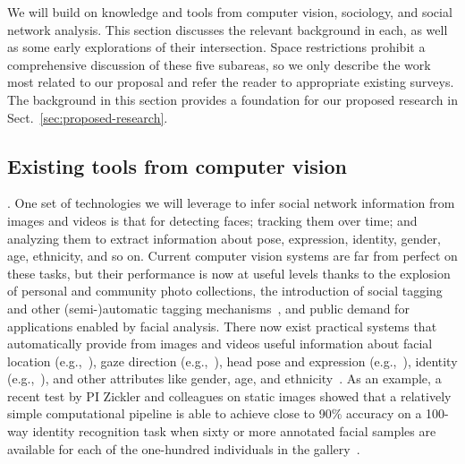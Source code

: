
We will build on knowledge and tools from computer vision, sociology, and social network analysis. This section discusses the relevant background in each, as well as some early explorations of their intersection. Space restrictions prohibit a comprehensive discussion of these five subareas, so we only describe the work most related to our proposal and refer the reader to appropriate existing surveys. The background in this section provides a foundation for our proposed research in Sect.~\ref{sec:proposed-research}.

\subsection{Existing tools from computer vision}

. One set of technologies we will leverage to infer social network information from images and videos is that for detecting faces; tracking them over time; and analyzing them to extract information about pose, expression, identity, gender, age, ethnicity, and so on.  Current computer vision systems are  far from perfect on these tasks, but their performance is now at useful levels thanks to the explosion of personal and community photo collections, the introduction of social tagging~\cite{Stone2008,Stone2010} and other (semi-)automatic tagging mechanisms~\cite{berg2004naf,berg2005sp,Everingham06a,huang:lfw}, and public demand for applications enabled by facial analysis. There now exist practical systems that automatically provide from images and videos useful information about facial location (e.g.,~\cite{ViolaJones,Zhang:detect,Comaniciu:track}), gaze direction (e.g.,~\cite{Hanson}), head pose and expression (e.g.,~\cite{Murphy-Chutorian:pose,Matthews:AAM,Lucey:AAM,Mumford:face,Yacoob:expression,delaTorre:expression,Essa:expression,huang:lfw,HolubMoreelsPeronaFG08}), identity (e.g.,~\cite{PintoZickler2011}), and other attributes like gender, age, and ethnicity~\cite{LNCS53050340}. As  an example, a recent test by PI Zickler and colleagues on static images showed that a relatively simple computational pipeline is able to achieve close to 90\% accuracy on a 100-way identity recognition task when sixty or more annotated facial samples are available for each of the one-hundred individuals in the gallery~\cite{PintoZickler2011}. 

